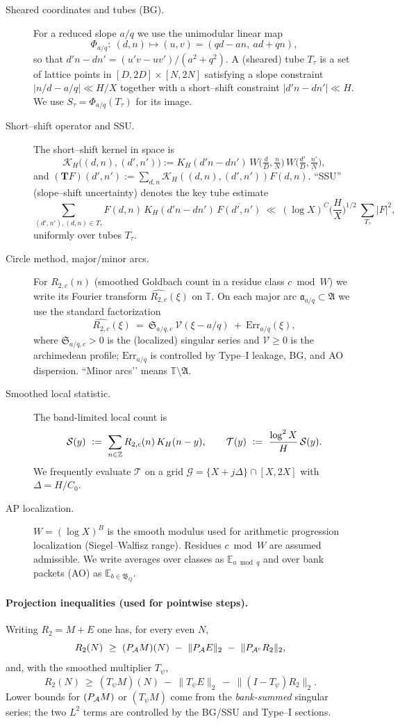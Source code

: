 \begin{description}
\item[Sheared coordinates and tubes (BG).]
For a reduced slope $a/q$ we use the unimodular linear map
\[
\Phi_{a/q}:\ (d,n)\mapsto (u,v)=(qd-an,\ ad+qn),
\]
so that $d'n-d n'=(u'v-uv')/(a^2+q^2)$.  
A (sheared) tube $T_\tau$ is a set of lattice points in $[D,2D]\times[N,2N]$ satisfying a slope constraint $|n/d-a/q|\ll H/X$ together with a short–shift constraint $|d'n-d n'|\ll H$.  
We use $S_\tau=\Phi_{a/q}(T_\tau)$ for its image.

\item[Short–shift operator and SSU.]
The short–shift kernel in space is
\[
\mathcal K_H\big((d,n),(d',n')\big):=K_H(d'n-d n')\,W\!\Big(\tfrac dD,\tfrac nN\Big)\,W\!\Big(\tfrac{d'}D,\tfrac{n'}N\Big),
\]
and $(\mathbf T F)(d',n'):=\sum_{d,n}\mathcal K_H((d,n),(d',n'))F(d,n)$.  
“SSU” (slope–shift uncertainty) denotes the key tube estimate
\[
\sum_{(d',n'),(d,n)\in T_\tau} F(d,n)\,K_H(d'n-d n')\,\overline{F(d',n')}
\ \ll\ (\log X)^C\Big(\frac{H}{X}\Big)^{\!1/2}\ \sum_{T_\tau}|F|^2,
\]
uniformly over tubes $T_\tau$.

\item[Circle method, major/minor arcs.]
For $R_{2,c}(n)$ (smoothed Goldbach count in a residue class $c\bmod W$) we write its Fourier transform $\widehat{R_{2,c}}(\xi)$ on $\mathbb T$.  
On each major arc $\mathfrak a_{a/q}\subset\mathfrak A$ we use the standard factorization
\[
\widehat{R_{2,c}}(\xi)\ =\ \mathfrak S_{a/q,c}\ \mathcal V(\xi-a/q)\ +\ \mathrm{Err}_{a/q}(\xi),
\]
where $\mathfrak S_{a/q,c}>0$ is the (localized) singular series and $\mathcal V\ge 0$ is the archimedean profile; $\mathrm{Err}_{a/q}$ is controlled by Type–I leakage, BG, and AO dispersion.  
“Minor arcs’’ means $\mathbb T\setminus \mathfrak A$.

\item[Smoothed local statistic.]
The band-limited local count is
\[
\mathcal S(y)\ :=\ \sum_{n\in\mathbb{Z}} R_{2,c}(n)\,K_H(n-y),\qquad
\mathcal T(y)\ :=\ \frac{\log^2 X}{H}\,\mathcal S(y).
\]
We frequently evaluate $\mathcal T$ on a grid $\mathcal G=\{X+j\Delta\}\cap[X,2X]$ with $\Delta=H/C_0$.

\item[AP localization.]
$W=(\log X)^B$ is the smooth modulus used for arithmetic progression localization (Siegel–Walfisz range).  
Residues $c\bmod W$ are assumed admissible.  
We write averages over classes as $\mathbb E_{a \bmod q}$ and over bank packets (AO) as $\mathbb E_{b\in\mathfrak B_Q}$.

\end{description}

\paragraph{Projection inequalities (used for pointwise steps).}
Writing $R_2=M+E$ one has, for every even $N$,
\[
R_2(N)\ \ge\ (\PA M)(N)\ -\ \|\PA E\|_2\ -\ \|P_{\cA^c}R_2\|_2,
\]
and, with the smoothed multiplier $T_\psi$,
\[
R_2(N)\ \ge\ (T_\psi M)(N)\ -\ \|T_\psi E\|_2\ -\ \|(I-T_\psi)R_2\|_2.
\]
Lower bounds for $(P_{\mathcal{A}} M)$ or $(T_\psi M)$ come from the \emph{bank-summed} singular series; the two $L^2$ terms are controlled by the BG/SSU and Type–I sections.
